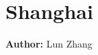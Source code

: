 \section{Shanghai}
\label{ch:scenarios:shanghai}
\hfill \textbf{Author:} Lun Zhang

\citep[][]{WangtEtAl_TRB_2013}









